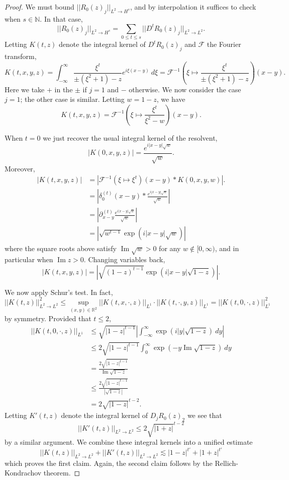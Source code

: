 \documentclass[12pt]{report}
\newcommand{\NN}{\mathbb{N}}
\newcommand{\RR}{\mathbb{R}}
\renewcommand{\Im}{\operatorname{Im}}
\theoremstyle{definition}
\begin{document}
\begin{proof}
We must bound $||R_0(z)_j||_{L^2 \to H^s}$, and by interpolation it suffices to check when $s \in \NN$. In that case,
$$||R_0(z)_j||_{L^2 \to H^s} = \sum_{0 \leq t \leq s} ||D^tR_0(z)_j||_{L^2 \to L^2}.$$
Letting $K(t, z)$ denote the integral kernel of $D^tR_0(z)_j$ and $\mathcal F$ the Fourier transform,
$$K(t, x, y, z) = \int_{-\infty}^\infty \frac{\xi^t}{\pm(\xi^2 + 1)-z}e^{i\xi(x-y)}~d\xi = \mathcal F^{-1}\left(\xi \mapsto \frac{\xi^t}{\pm(\xi^2 +1)-z}\right)(x-y).$$
Here we take $+$ in the $\pm$ if $j = 1$ and $-$ otherwise. We now consider the case $j = 1$; the other case is similar. Letting $w = 1 - z$, we have
$$K(t, x, y, z) = \mathcal F^{-1}\left(\xi \mapsto \frac{\xi^t}{\xi^2 - w}\right)(x-y).$$

When $t = 0$ we just recover the usual integral kernel of the resolvent,
$$|K(0, x, y, z)| = \frac{e^{i|x-y|\sqrt w}}{\sqrt w}.$$
Moreover,
\begin{align*}
  |K(t, x, y, z)| &= |\mathcal F^{-1}(\xi \mapsto \xi^t)(x-y) * K(0, x, y, w)|.\\
  &= \left|\delta^{(t)}_0(x-y) * \frac{e^{i|x-y|\sqrt w}}{\sqrt w}\right|\\
  &= \left|\partial_{x-y}^{(t)} \frac{e^{i|x-y|\sqrt w}}{\sqrt w}\right|\\
  &= \left|\sqrt{w^{t-1}} \exp(i|x-y|\sqrt w)\right|
\end{align*}
where the square roots above satisfy $\Im \sqrt w > 0$ for any $w \notin [0, \infty)$, and in particular when $\Im z > 0$. Changing variables back,
$$|K(t, x, y, z)| = \left|\sqrt{(1-z)^{t-1}} \exp(i|x-y|\sqrt{1-z})\right|.$$

We now apply Schur's test. In fact,
$$||K(t, z)||_{L^2 \to L^2}^2 \leq \sup_{(x, y) \in \RR^2} ||K(t, x, \cdot, z)||_{L^1} \cdot ||K(t, \cdot, y, z)||_{L^1} = ||K(t, 0, \cdot, z)||_{L^1}^2$$
by symmetry. Provided that $t \leq 2$,
\begin{align*}
  ||K(t, 0, \cdot, z)||_{L^1} &\leq \sqrt{|1-z|^{t-1}} \left|\int_{-\infty}^\infty \exp(i|y|\sqrt{1-z}) ~dy\right|\\
  &\leq 2\sqrt{|1-z|^{t-1}} \int_0^\infty \exp(-y\Im\sqrt{1-z})~dy\\
  &= \frac{2\sqrt{|1-z|^{t-1}}}{\Im \sqrt{1-z}}\\
  &\leq \frac{2\sqrt{|1-z|^{t-1}}}{|\sqrt{1-z}|}\\
  &= 2\sqrt{|1-z|}^{t-2}.
\end{align*}
Letting $K'(t, z)$ denote the integral kernel of $D_jR_0(z)_2$ we see that
$$||K'(t, z)||_{L^2 \to L^2} \leq 2\sqrt{|1+z|}^{t-2}$$
by a similar argument. We combine these integral kernels into a unified estimate
$$||K(t, z)||_{L^2 \to L^2} + ||K'(t, z)||_{L^2 \to L^2} \lesssim |1-z|^{t'} + |1+z|^{t'}$$
which proves the first claim.
Again, the second claim follows by the Rellich-Kondrachov theorem.
\end{proof}
\end{document}
